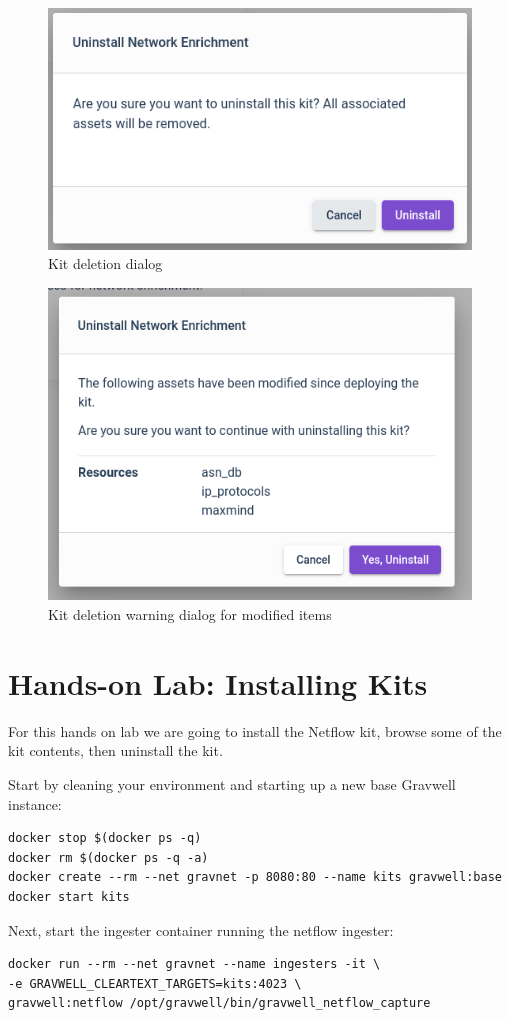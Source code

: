 \begin{figure}[H]
	\includegraphics[width=0.4\linewidth]{images/uninstall-confirm.png}
	\caption{Kit deletion dialog}
	\label{fig:uninstall-confirm}
\end{figure}

\begin{figure}[H]
	\includegraphics[width=0.4\linewidth]{images/uninstall-warn.png}
	\caption{Kit deletion warning dialog for modified items}
	\label{fig:uninstall-warn}
\end{figure}

\section{Hands-on Lab: Installing Kits}

For this hands on lab we are going to install the Netflow kit, browse some of the kit contents, then uninstall the kit.

Start by cleaning your environment and starting up a new base Gravwell
instance:

\begin{Verbatim}[breaklines=true]
docker stop $(docker ps -q)
docker rm $(docker ps -q -a)
docker create --rm --net gravnet -p 8080:80 --name kits gravwell:base
docker start kits
\end{Verbatim}

Next, start the ingester container running the netflow ingester:

\begin{Verbatim}[breaklines=true]
docker run --rm --net gravnet --name ingesters -it \
-e GRAVWELL_CLEARTEXT_TARGETS=kits:4023 \
gravwell:netflow /opt/gravwell/bin/gravwell_netflow_capture
\end{Verbatim}

